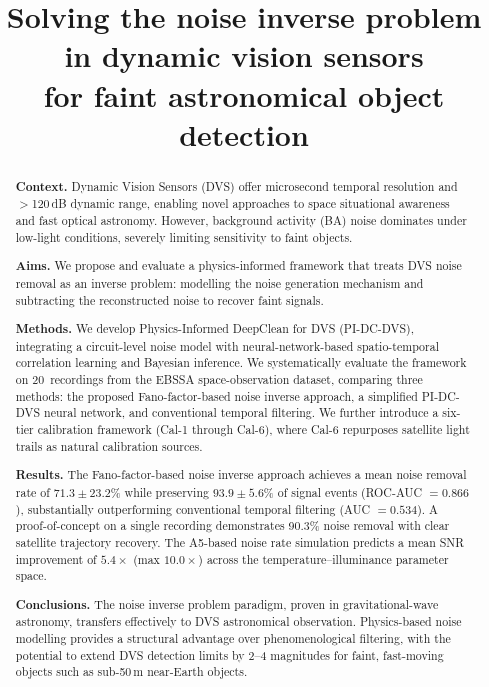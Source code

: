 \documentclass[twocolumn]{article}
\title{Solving the noise inverse problem in dynamic vision sensors\\
for faint astronomical object detection}
\author{
}
\date{}
\begin{document}
\maketitle

\begin{abstract}
\noindent
\textbf{Context.}
Dynamic Vision Sensors (DVS) offer microsecond temporal resolution and $>$120\,dB dynamic range, enabling novel approaches to space situational awareness and fast optical astronomy.
However, background activity (BA) noise dominates under low-light conditions, severely limiting sensitivity to faint objects.

\noindent
\textbf{Aims.}
We propose and evaluate a physics-informed framework that treats DVS noise removal as an inverse problem: modelling the noise generation mechanism and subtracting the reconstructed noise to recover faint signals.

\noindent
\textbf{Methods.}
We develop Physics-Informed DeepClean for DVS (PI-DC-DVS), integrating a circuit-level noise model with neural-network-based spatio-temporal correlation learning and Bayesian inference.
We systematically evaluate the framework on 20~recordings from the EBSSA space-observation dataset, comparing three methods: the proposed Fano-factor-based noise inverse approach, a simplified PI-DC-DVS neural network, and conventional temporal filtering.
We further introduce a six-tier calibration framework (Cal-1 through Cal-6), where Cal-6 repurposes satellite light trails as natural calibration sources.

\noindent
\textbf{Results.}
The Fano-factor-based noise inverse approach achieves a mean noise removal rate of $71.3 \pm 23.2$\% while preserving $93.9 \pm 5.6$\% of signal events (ROC-AUC $= 0.866$), substantially outperforming conventional temporal filtering (AUC $= 0.534$).
A proof-of-concept on a single recording demonstrates 90.3\% noise removal with clear satellite trajectory recovery.
The A5-based noise rate simulation predicts a mean SNR improvement of $5.4\times$ (max $10.0\times$) across the temperature--illuminance parameter space.

\noindent
\textbf{Conclusions.}
The noise inverse problem paradigm, proven in gravitational-wave astronomy, transfers effectively to DVS astronomical observation.
Physics-based noise modelling provides a structural advantage over phenomenological filtering, with the potential to extend DVS detection limits by 2--4 magnitudes for faint, fast-moving objects such as sub-50\,m near-Earth objects.
\end{abstract}
\end{document}
